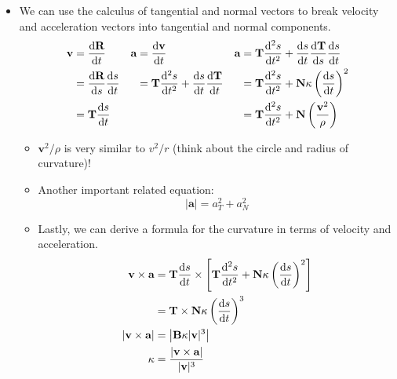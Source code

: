 \documentclass[../main.tex]{subfiles}
\begin{document}
\begin{itemize}
\begin{itemize}
    \end{itemize}
    \item We can use the calculus of tangential and normal vectors to break velocity and acceleration vectors into tangential and normal components.
    \begin{align*}
        \textbf{v} &= \dv{\textbf{R}}{t}&
            \textbf{a} &= \dv{\textbf{v}}{t}&
                \textbf{a} &= \textbf{T}\dv[2]{s}{t}+\dv{s}{t}\dv{\textbf{T}}{s}\dv{s}{t}\\
        &= \dv{\textbf{R}}{s}\dv{s}{t}&
            &= \textbf{T}\dv[2]{s}{t}+\dv{s}{t}\dv{\textbf{T}}{t}&
                &= \textbf{T}\dv[2]{s}{t}+\textbf{N}\kappa\left( \dv{s}{t} \right)^2\\
        &= \textbf{T}\dv{s}{t}&
            &&
                &= \textbf{T}\dv[2]{s}{t}+\textbf{N}\left( \frac{\textbf{v}^2}{\rho} \right)
    \end{align*}
    \begin{itemize}
        \item $\textbf{v}^2/\rho$ is very similar to $v^2/r$ (think about the circle and radius of curvature)!
        \item Another important related equation:
        \begin{equation*}
            |\textbf{a}| = a_T^2+a_N^2
        \end{equation*}
        \item Lastly, we can derive a formula for the curvature in terms of velocity and acceleration.
        \begin{align*}
            \textbf{v}\times\textbf{a} &= \textbf{T}\dv{s}{t}\times\left[ \textbf{T}\dv[2]{s}{t}+\textbf{N}\kappa\left( \dv{s}{t} \right)^2 \right]\\
            &= \textbf{T}\times\textbf{N}\kappa\left( \dv{s}{t} \right)^3\\
            |\textbf{v}\times\textbf{a}| &= \left| \textbf{B}\kappa|\textbf{v}|^3 \right|\\
            \kappa &= \frac{|\textbf{v}\times\textbf{a}|}{|\textbf{v}|^3}
        \end{align*}
    \end{itemize}
\end{itemize}
\end{document}
